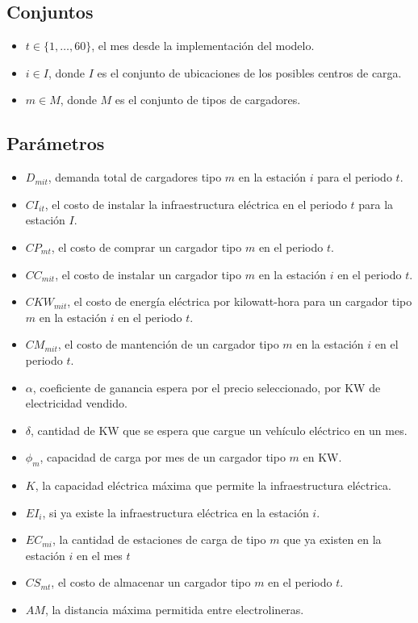 \documentclass[letterpaper]{article}
\begin{document}
\begin{flushleft}
	\subsection{Conjuntos}
	\begin{itemize}
		\item $t \in \{1, \ldots, 60\}$, el mes desde la implementación del modelo.
		\item $i \in I$, donde $I$ es el conjunto de ubicaciones de los posibles centros de carga.
		\item $m \in M$, donde $M$ es el conjunto de tipos de cargadores.
	\end{itemize}

	\subsection{Parámetros}
	\begin{itemize}
		\item $D_{mit}$, demanda total de cargadores tipo $m$ en la estación $i$ para el periodo $t$.
		\item $CI_{it}$, el costo de instalar la infraestructura el\'ectrica en el periodo $t$ para la estaci\'on $I$.
		\item $CP_{mt}$, el costo de comprar un cargador tipo $m$ en el periodo $t$.
		\item $CC_{mit}$, el costo de instalar un cargador tipo $m$ en la estación $i$ en el periodo $t$.
		\item $CKW_{mit}$, el costo de energía eléctrica por kilowatt-hora para un cargador tipo $m$ en la estación $i$ en el periodo $t$.
		\item $CM_{mit}$, el costo de mantención de un cargador tipo $m$ en la estación $i$ en el periodo $t$.
		\item $\alpha$, coeficiente de ganancia espera por el precio seleccionado, por KW de electricidad vendido.
		\item $\delta$, cantidad de KW que se espera que cargue un vehículo eléctrico en un mes.
		\item $\phi_m$, capacidad de carga por mes de un cargador tipo $m$ en KW.
		\item $K$, la capacidad eléctrica máxima que permite la infraestructura eléctrica.
		\item $EI_{i}$, si ya existe la infraestructura eléctrica en la estación $i$.
		\item $EC_{mi}$, la cantidad de estaciones de carga de tipo $m$ que ya existen en la estación $i$ en el mes $t$
		\item $CS_{mt}$, el costo de almacenar un cargador tipo $m$ en el periodo $t$.
		\item $AM$, la distancia máxima permitida entre electrolineras.
	\end{itemize}

\end{flushleft}
\end{document}
